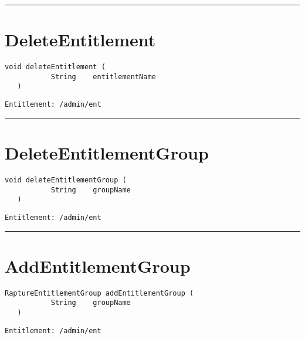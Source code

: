 \rule{12cm}{2pt}
\section{DeleteEntitlement}
\label{Api:DeleteEntitlement}
\begin{lstlisting}[style=nonumbers]
   void deleteEntitlement (
           String    entitlementName
   )
\end{lstlisting}
\begin{Verbatim}[formatcom=\color{Maroon}]
  Entitlement: /admin/ent
\end{Verbatim}



\rule{12cm}{2pt}
\section{DeleteEntitlementGroup}
\label{Api:DeleteEntitlementGroup}
\begin{lstlisting}[style=nonumbers]
   void deleteEntitlementGroup (
           String    groupName
   )
\end{lstlisting}
\begin{Verbatim}[formatcom=\color{Maroon}]
  Entitlement: /admin/ent
\end{Verbatim}



\rule{12cm}{2pt}
\section{AddEntitlementGroup}
\label{Api:AddEntitlementGroup}
\begin{lstlisting}[style=nonumbers]
   RaptureEntitlementGroup addEntitlementGroup (
           String    groupName
   )
\end{lstlisting}
\begin{Verbatim}[formatcom=\color{Maroon}]
  Entitlement: /admin/ent
\end{Verbatim}



